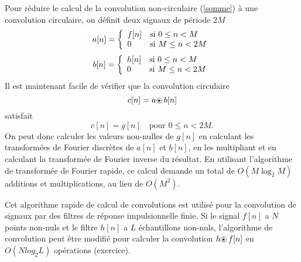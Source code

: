 Pour r\'eduire le calcul de
la convolution non-circulaire (\ref{somme})
\`a une convolution circulaire, on d\'efinit deux signaux
de p\'eriode $2M$
\begin{equation}
a [ n  ] =
   \left \{ \begin{array}{ll}
            f[n]   & \mbox{si $0 \leq n < M$}\\
            0  & \mbox{si $ M \leq n < 2M$}
            \end{array}
   \right.
\end{equation}
\begin{equation}
b [ n  ] =
   \left \{ \begin{array}{ll}
            h[n] &  \mbox{si $ 0 \leq n < M$}\\
            0  & \mbox{si $M \leq n < 2M$}
            \end{array}
   \right.
\end{equation}
Il est maintenant facile de v\'erifier que la convolution circulaire
\[
c[n] = a {\mbox{$\odot \!\!\!\!\star~$}} b [n]
\]
satisfait
\begin{equation}
c [ n  ] =  g[n]   \mbox{~~~pour } 0 \leq n < 2M .
\end{equation}
On peut donc calculer les valeurs non-nulles de
$g[n]$ en calculant les transform\'ees de Fourier discr\`etes
de $a[n]$ et $b[n]$, en les multipliant et
en calculant la transform\'ee de Fourier inverse du r\'esultat.
En utilisant l'algorithme de transform\'ee de Fourier rapide,
ce calcul demande un total de $O(M \log_2 M)$ additions
et multiplications, au lieu de $O(M^2)$.

Cet algorithme rapide de calcul de convolutions est utilis\'e
pour la convolution de signaux par des filtres de r\'eponse
impulsionnelle finie. Si le signal $f[n]$ a $N$ points
non-nuls et le filtre $h[n]$ a $L$ \'echantillons non-nuls,
l'algorithme de convolution peut \^etre
modifi\'e pour calculer la convolution $h {\mbox{$\odot \!\!\!\!\star~$}} f[n]$
en $O(N log_2 L )$ op\'erations (exercice).
%








